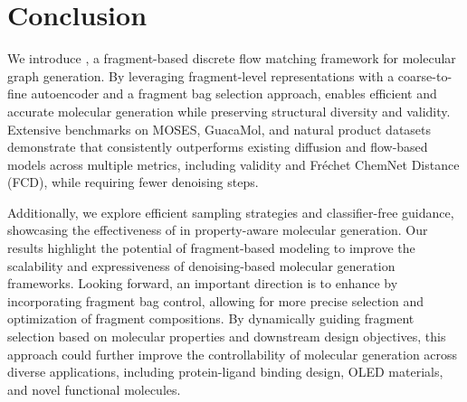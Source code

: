 \section{Conclusion}
\label{sec:conclusion}

We introduce \methodname{}, a fragment-based discrete flow matching framework for molecular graph generation. 
By leveraging fragment-level representations with a coarse-to-fine autoencoder and a fragment bag selection approach, \methodname{} enables efficient and accurate molecular generation while preserving structural diversity and validity. 
Extensive benchmarks on MOSES, GuacaMol, and natural product datasets demonstrate that \methodname{} consistently outperforms existing diffusion and flow-based models across multiple metrics, including validity and Fréchet ChemNet Distance (FCD), while requiring fewer denoising steps.

Additionally, we explore efficient sampling strategies and classifier-free guidance, showcasing the effectiveness of \methodname{} in property-aware molecular generation. 
Our results highlight the potential of fragment-based modeling to improve the scalability and expressiveness of denoising-based molecular generation frameworks. 
Looking forward, an important direction is to enhance \methodname{} by incorporating fragment bag control, allowing for more precise selection and optimization of fragment compositions.
By dynamically guiding fragment selection based on molecular properties and downstream design objectives, this approach could further improve the controllability of molecular generation across diverse applications, including protein-ligand binding design, OLED materials, and novel functional molecules.
